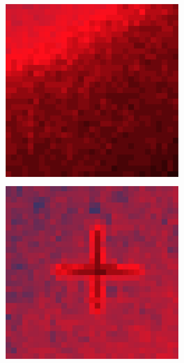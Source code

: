 \documentclass[10pt]{scrartcl}
\begin{document}
\begin{figure}[!ht]
    \begin{subfigure}[b]{.3\linewidth}
        \centering
        \includegraphics[width=1.2\linewidth]{../plots_tables_images/1d1dcrop_6_0.eps}
    \end{subfigure}
    \begin{subfigure}[b]{.3\linewidth}
        \centering
        \includegraphics[width=1.2\linewidth]{../plots_tables_images/1d1dcrop_6_3.eps}

\end{subfigure}
\end{figure}
\end{document}
